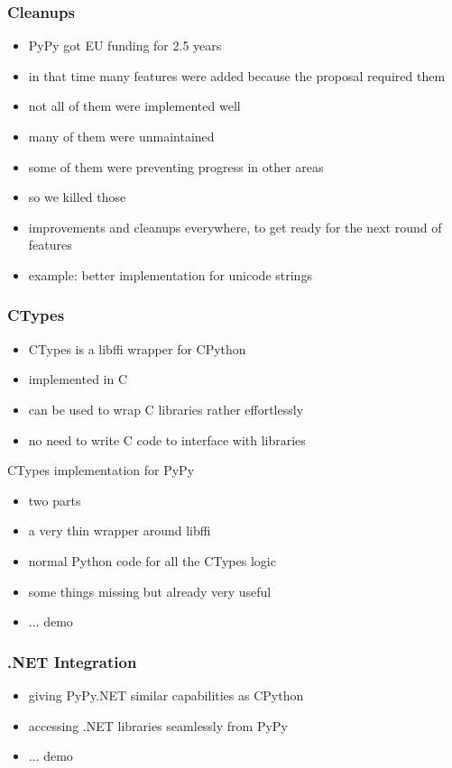 \documentclass[utf8x]{beamer}
\begin{document}
\begin{frame}
  \frametitle{Cleanups}
  \begin{itemize}
  \item PyPy got EU funding for 2.5 years
  \item in that time many features were added because the proposal required them
  \item not all of them were implemented well
  \item many of them were unmaintained
  \item some of them were preventing progress in other areas
  \item so we killed those
  \item improvements and cleanups everywhere, to get ready for the next round of features
  \item example: better implementation for unicode strings
  \end{itemize}
\end{frame}

\begin{frame}
  \frametitle{CTypes}
  \begin{itemize}
  \item CTypes is a libffi wrapper for CPython
  \item implemented in C
  \item can be used to wrap C libraries rather effortlessly
  \item no need to write C code to interface with libraries
  
  \end{itemize}
  \pause
  \begin{block}{
    CTypes implementation for PyPy}
    \begin{itemize}
    \item two parts
    \item a very thin wrapper around libffi
    \item normal Python code for all the CTypes logic
    \item some things missing but already very useful
    \item ... demo
    \end{itemize}
  \end{block}
\end{frame}


\begin{frame}
  \frametitle{.NET Integration}
  \begin{itemize}
  \item giving PyPy.NET similar capabilities as CPython
  \item accessing .NET libraries seamlessly from PyPy
  \item ... demo
  \end{itemize}
\end{frame}
\end{document}
